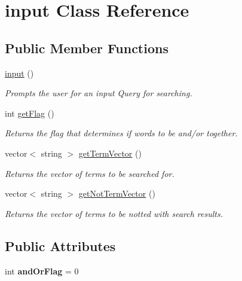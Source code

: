 \hypertarget{classinput}{}\section{input Class Reference}
\label{classinput}
\subsection*{Public Member Functions}
\begin{DoxyCompactItemize}
\item 
\mbox{\label{classinput_adac0ea346c43d7762baef3e3f387eebd}} 
\mbox{\hyperlink{classinput_adac0ea346c43d7762baef3e3f387eebd}{input}} ()
\begin{DoxyCompactList}\small\item\em Prompts the user for an input Query for searching. \end{DoxyCompactList}\item 
int \mbox{\hyperlink{classinput_af8a7e9c56d11bd47067a1d6a04b97629}{get\+Flag}} ()
\begin{DoxyCompactList}\small\item\em Returns the flag that determines if words to be and/or together. \end{DoxyCompactList}\item 
vector$<$ string $>$ \mbox{\hyperlink{classinput_abc12997975bf5df011bbb073611225fa}{get\+Term\+Vector}} ()
\begin{DoxyCompactList}\small\item\em Returns the vector of terms to be searched for. \end{DoxyCompactList}\item 
vector$<$ string $>$ \mbox{\hyperlink{classinput_ac4c7f5fae89a9f8a85e05027ef1aab0d}{get\+Not\+Term\+Vector}} ()
\begin{DoxyCompactList}\small\item\em Returns the vector of terms to be notted with search results. \end{DoxyCompactList}\end{DoxyCompactItemize}
\subsection*{Public Attributes}
\begin{DoxyCompactItemize}
\item 
\mbox{\label{classinput_a7d8969f06f1d5b287d9505db6c156fa7}} 
int {\bfseries and\+Or\+Flag} = 0
\end{DoxyCompactItemize}


